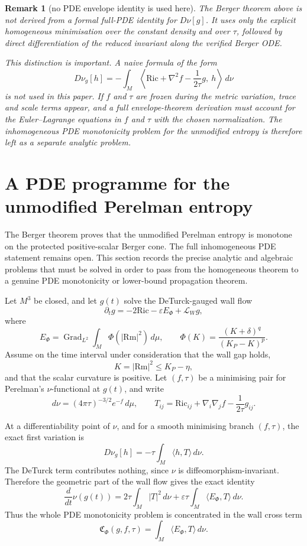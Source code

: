 \documentclass[11pt]{amsart}
\newtheorem{remark}{Remark}
\newcommand{\Rm}{\mathrm{Rm}}
\newcommand{\Ric}{\mathrm{Ric}}
\newcommand{\KP}{K_{\!P}}
\newcommand{\Grad}{\operatorname{Grad}}
\begin{document}
\begin{remark}[no PDE envelope identity is used here]
The Berger theorem above is not derived from a formal full-PDE identity for
\(D\nu[g]\).  It uses only the explicit homogeneous minimisation over the
constant density and over \(\tau\), followed by direct differentiation of the
reduced invariant along the verified Berger ODE.

This distinction is important.  A naive formula of the form
\[
        D\nu_g[h]=-\int_M\left\langle
        \Ric+\nabla^2 f-\frac1{2\tau}g,\ h\right\rangle\,d\nu
\]
is not used in this paper.  If \(f\) and \(\tau\) are frozen during the metric
variation, trace and scale terms appear, and a full envelope-theorem derivation
must account for the Euler--Lagrange equations in \(f\) and \(\tau\) with the
chosen normalization.  The inhomogeneous PDE monotonicity problem for the
unmodified entropy is therefore left as a separate analytic problem.
\end{remark}



\section{A PDE programme for the unmodified Perelman entropy}

The Berger theorem proves that the unmodified Perelman entropy is monotone on
the protected positive-scalar Berger cone.  The full inhomogeneous PDE
statement remains open.  This section records the precise analytic and
algebraic problems that must be solved in order to pass from the homogeneous
theorem to a genuine PDE monotonicity or lower-bound propagation theorem.

Let \(M^3\) be closed, and let \(g(t)\) solve the DeTurck-gauged wall flow
\begin{equation}\label{eq:PDE-wall}
\partial_t g = -2\Ric - \varepsilon E_\Phi + \mathcal{L}_W g,
\end{equation}
where
\[
E_\Phi = \Grad_{L^2}\int_M\Phi(|\Rm|^2)\,d\mu,
\qquad
\Phi(K)=\frac{(K+\delta)^q}{(\KP-K)^p}.
\]
Assume on the time interval under consideration that the wall gap holds,
\[
K=|\Rm|^2\le \KP-\eta,
\]
and that the scalar curvature is positive.  Let \((f,\tau)\) be a minimising
pair for Perelman's \(\nu\)-functional at \(g(t)\), and write
\[
d\nu=(4\pi\tau)^{-3/2}e^{-f}\,d\mu,
\qquad
T_{ij}= \Ric_{ij}+\nabla_i\nabla_j f-\frac1{2\tau}g_{ij}.
\]

At a differentiability point of \(\nu\), and for a smooth minimising branch
\((f,\tau)\), the exact first variation is
\[
D\nu_g[h] = -\tau\int_M\langle h,T\rangle\,d\nu .
\]
The DeTurck term contributes nothing, since \(\nu\) is
diffeomorphism-invariant.  Therefore the geometric part of the wall flow gives
the exact identity
\begin{equation}\label{eq:nu-derivative}
\boxed{ \frac{d}{dt}\nu(g(t)) = 2\tau\int_M |T|^2\,d\nu
+ \varepsilon\tau\int_M\langle E_\Phi,T\rangle\,d\nu . }
\end{equation}
Thus the whole PDE monotonicity problem is concentrated in the wall cross term
\[
\mathfrak C_\Phi(g,f,\tau) = \int_M\langle E_\Phi,T\rangle\,d\nu .
\]
\end{document}

